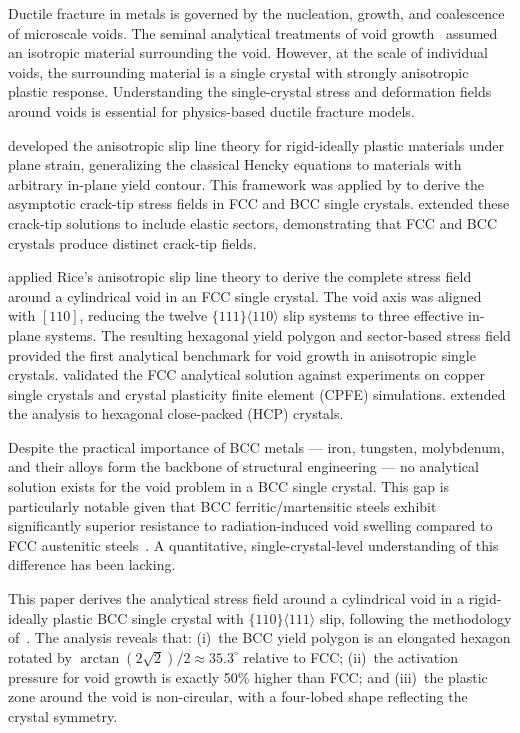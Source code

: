 \documentclass{svjour3} %
\begin{document}
Ductile fracture in metals is governed by the nucleation, growth, and
coalescence of microscale voids. The seminal analytical treatments of void
growth~\citep{mcclintock1968,rice1969} assumed an isotropic material
surrounding the void. However, at the scale of individual voids, the
surrounding material is a single crystal with strongly anisotropic plastic
response. Understanding the single-crystal stress and deformation fields
around voids is essential for physics-based ductile fracture models.

\citet{rice1973} developed the anisotropic slip line theory for
rigid-ideally plastic materials under plane strain, generalizing the
classical Hencky equations to materials with arbitrary in-plane yield
contour. This framework was applied by \citet{rice1987} to derive the
asymptotic crack-tip stress fields in FCC and BCC single crystals.
\citet{drugan2001} extended these crack-tip solutions to include elastic
sectors, demonstrating that FCC and BCC crystals produce distinct
crack-tip fields.

\citet{kysar2005} applied Rice's anisotropic slip line theory to derive
the complete stress field around a cylindrical void in an FCC single
crystal. The void axis was aligned with $[110]$, reducing the twelve
$\{111\}\langle 110\rangle$ slip systems to three effective in-plane
systems. The resulting hexagonal yield polygon and sector-based stress
field provided the first analytical benchmark for void growth in
anisotropic single crystals. \citet{gan2006} validated the FCC
analytical solution against experiments on copper single crystals and
crystal plasticity finite element (CPFE) simulations. \citet{gan2007}
extended the analysis to hexagonal close-packed (HCP) crystals.

Despite the practical importance of BCC metals --- iron, tungsten,
molybdenum, and their alloys form the backbone of structural engineering
--- no analytical solution exists for the void problem in a BCC single
crystal. This gap is particularly notable given that BCC
ferritic/martensitic steels exhibit significantly superior resistance to
radiation-induced void swelling compared to FCC austenitic
steels~\citep{garner2010,zinkle2013}. A quantitative, single-crystal-level
understanding of this difference has been lacking.

This paper derives the analytical stress field around a cylindrical
void in a rigid-ideally plastic BCC single crystal with
$\{110\}\langle 111\rangle$ slip, following the methodology
of~\citet{kysar2005}. The analysis reveals that:
(i)~the BCC yield polygon is an elongated hexagon rotated by
$\arctan(2\sqrt{2})/2 \approx 35.3^\circ$ relative to FCC;
(ii)~the activation pressure for void growth is exactly 50\% higher
than FCC; and (iii)~the plastic zone around the void is non-circular,
with a four-lobed shape reflecting the crystal symmetry.
\end{document}
